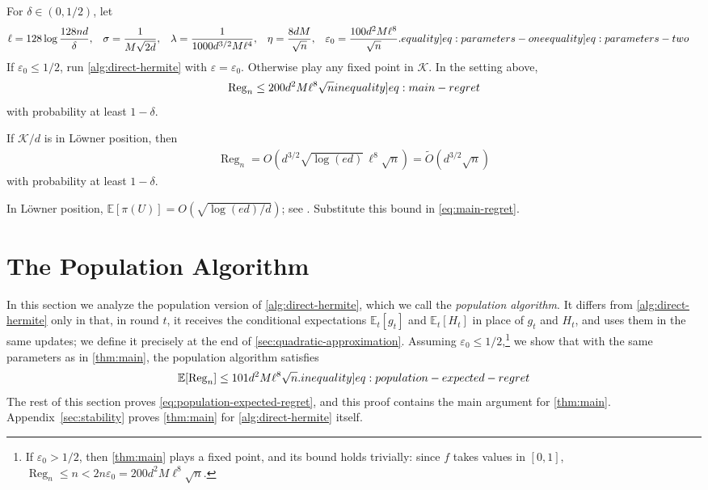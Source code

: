 \documentclass[12pt,cleveref]{jmlr}
\renewenvironment{proof}[1][\proofname]
{\par\noindent{\bfseries\upshape #1\ }}
{\jmlrQED}
\newcommand{\eqlabel}[1]{\label[equality]{#1}}
\newcommand{\ineqlabel}[1]{\label[inequality]{#1}}
\newcommand{\E}{\mathbb E}
\newcommand{\K}{\mathcal K}
\newcommand{\1}{\mathbf 1}
\newcommand{\eps}{\varepsilon}
\begin{document}
\begin{theorem}
    \label{thm:main}
    For $\delta\in(0,1/2)$, let
    \begin{align}
        \ell    & =128\log\frac{128nd}{\delta},
        &
        \sigma  & =\frac1{M\sqrt{2d}},
        &
        \lambda & =\frac{1}{1000d^{3/2}M\ell^4},
        &
        \eta    & =\frac{8dM}{\sqrt n},
        &
        \eps_0  & =\frac{100d^2M\ell^8}{\sqrt n}.
        \eqlabel{eq:parameters-one}
        \eqlabel{eq:parameters-two}
    \end{align}
    If $\eps_0\leq1/2$, run \cref{alg:direct-hermite} with $\eps=\eps_0$.
    Otherwise play any fixed point in $\K$.  In the setting above,
    \begin{align}
        \operatorname{Reg}_n
        \leq 200d^2M\ell^8\sqrt n
        \ineqlabel{eq:main-regret}
    \end{align}
    with probability at least $1-\delta$.
\end{theorem}

\begin{corollary}
    \label{cor:loewner}
    If $\K/d$ is in L\"owner position, then
    \begin{align}
        \operatorname{Reg}_n
        =O\!\left(
            d^{3/2}\sqrt{\log(ed)}\,\ell^8\sqrt n
        \right)
        =\widetilde O(d^{3/2}\sqrt n)
    \end{align}
    with probability at least $1-\delta$.
\end{corollary}

\begin{proof}
    In L\"owner position,
    $\E[\pi(U)]=O(\sqrt{\log(ed)/d})$; see
    \citet[Table~10.1(a)]{lattimore2026bandit}.  Substitute this bound in
    \cref{eq:main-regret}.
\end{proof}

\section{The Population Algorithm}
\label{sec:population-algorithm}
In this section we analyze the population version of \cref{alg:direct-hermite}, which we call the \textit{population algorithm}.
It differs from \cref{alg:direct-hermite} only in that, in round $t$, it receives the conditional expectations $\E_t[g_t]$ and $\E_t[H_t]$ in place of $g_t$ and $H_t$, and uses them in the same updates; we define it precisely at the end of \cref{sec:quadratic-approximation}.
Assuming $\eps_0\leq1/2$,\footnote{
    If $\eps_0>1/2$, then \cref{thm:main} plays a fixed point, and its bound holds trivially: since $f$ takes values in $[0,1]$, $\operatorname{Reg}_n\leq n<2n\eps_0=200d^2M\ell^8\sqrt n$.
} we show that with the same parameters as in \cref{thm:main}, the population algorithm satisfies
\begin{align}
    \E[\operatorname{Reg}_n]\leq101d^2M\ell^8\sqrt n.
    \ineqlabel{eq:population-expected-regret}
\end{align}
The rest of this section proves \cref{eq:population-expected-regret}, and this proof contains the main argument for \cref{thm:main}.
Appendix~\ref{sec:stability} proves \cref{thm:main} for \cref{alg:direct-hermite} itself.
\end{document}
